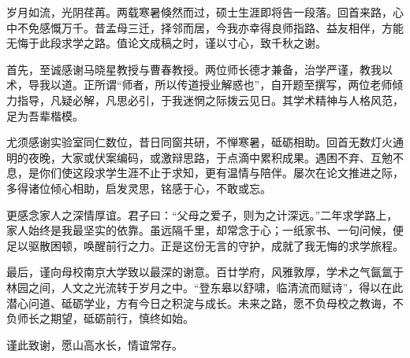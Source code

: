 \begin{acknowledgement}
岁月如流，光阴荏苒。两载寒暑倏然而过，硕士生涯即将告一段落。回首来路，心中不免感慨万千。昔孟母三迁，择邻而居，今我亦幸得良师指路、益友相伴，方能无悔于此段求学之路。值论文成稿之时，谨以寸心，致千秋之谢。

首先，至诚感谢马晓星教授与曹春教授。两位师长德才兼备，治学严谨，教我以术，导我以道。正所谓“师者，所以传道授业解惑也”，自开题至撰写，两位老师倾力指导，凡疑必解，凡思必引，于我迷惘之际拨云见日。其学术精神与人格风范，足为吾辈楷模。

尤须感谢实验室同仁数位，昔日同窗共研，不惮寒暑，砥砺相助。回首无数灯火通明的夜晚，大家或伏案编码，或激辩思路，于点滴中累积成果。遇困不弃、互勉不息，是你们使这段求学生涯不止于求知，更有温情与陪伴。屡次在论文推进之际，多得诸位倾心相助，启发灵思，铭感于心，不敢或忘。

更感念家人之深情厚谊。君子曰：“父母之爱子，则为之计深远。”二年求学路上，家人始终是我最坚实的依靠。虽远隔千里，却常念于心；一纸家书、一句问候，便足以驱散困顿，唤醒前行之力。正是这份无言的守护，成就了我无悔的求学旅程。

最后，谨向母校南京大学致以最深的谢意。百廿学府，风雅敦厚，学术之气氤氲于林园之间，人文之光流转于岁月之中。“登东皋以舒啸，临清流而赋诗”，得以在此潜心问道、砥砺学业，方有今日之积淀与成长。未来之路，愿不负母校之教诲，不负师长之期望，砥砺前行，慎终如始。

谨此致谢，愿山高水长，情谊常存。
\end{acknowledgement}
